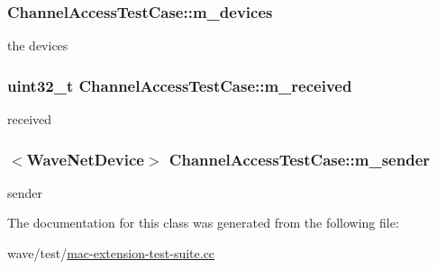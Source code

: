 \subsubsection[{\texorpdfstring{m\+\_\+devices}{m_devices}}]{ Channel\+Access\+Test\+Case\+::m\+\_\+devices\hspace{0.3cm}{\ttfamily [private]}}\hypertarget{classChannelAccessTestCase_a36ad5644e4eb713b912aed42eb3fe4dc}{}\label{classChannelAccessTestCase_a36ad5644e4eb713b912aed42eb3fe4dc}


the devices 

\subsubsection[{\texorpdfstring{m\+\_\+received}{m_received}}]{\setlength{\rightskip}{0pt plus 5cm}uint32\+\_\+t Channel\+Access\+Test\+Case\+::m\+\_\+received\hspace{0.3cm}{\ttfamily [private]}}\hypertarget{classChannelAccessTestCase_a5926e14afc012dd8c71ab238435a3ec9}{}\label{classChannelAccessTestCase_a5926e14afc012dd8c71ab238435a3ec9}


received 

\subsubsection[{\texorpdfstring{m\+\_\+sender}{m_sender}}]{$<${\bf Wave\+Net\+Device}$>$ Channel\+Access\+Test\+Case\+::m\+\_\+sender\hspace{0.3cm}{\ttfamily [private]}}\hypertarget{classChannelAccessTestCase_af2ed348403976d1e39d0099313ed3680}{}\label{classChannelAccessTestCase_af2ed348403976d1e39d0099313ed3680}


sender 



The documentation for this class was generated from the following file\+:\begin{DoxyCompactItemize}
\item 
wave/test/\hyperlink{mac-extension-test-suite_8cc}{mac-\/extension-\/test-\/suite.\+cc}\end{DoxyCompactItemize}
